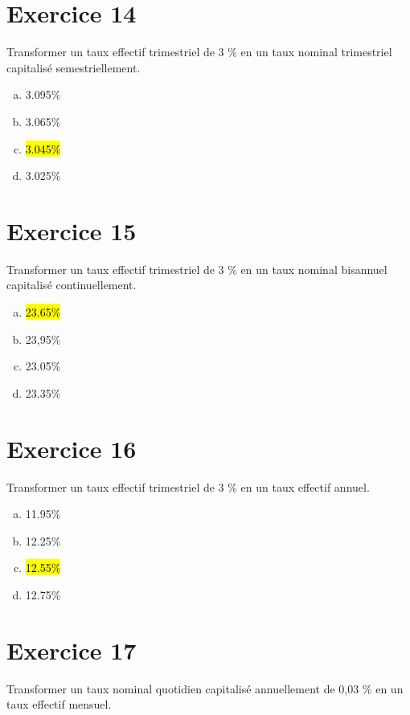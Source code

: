 \documentclass[10pt,a4paper]{article}
\begin{document}
\section*{Exercice 14}
Transformer un taux effectif trimestriel de 3 \% en un taux nominal trimestriel capitalisé semestriellement.



\begin{enumerate}[a)]
\item 3.095\%
\item 3.065\%
\item \hl{3.045\%}
\item 3.025\%
\end{enumerate}



\section*{Exercice 15}
Transformer un taux effectif trimestriel de 3 \% en un taux nominal bisannuel capitalisé continuellement.



\begin{enumerate}[a)]
\item \hl{23.65\%}
\item 23,95\%
\item 23.05\%
\item 23.35\%
\end{enumerate}


\section*{Exercice 16}
Transformer un taux effectif trimestriel de 3 \% en un taux effectif annuel.



\begin{enumerate}[a)]
\item 11.95\%
\item 12.25\%
\item \hl{12.55\%}
\item 12.75\%
\end{enumerate}


\section*{Exercice 17}
Transformer un taux nominal quotidien capitalisé annuellement de 0,03 \% en un taux effectif mensuel.
\end{document}
